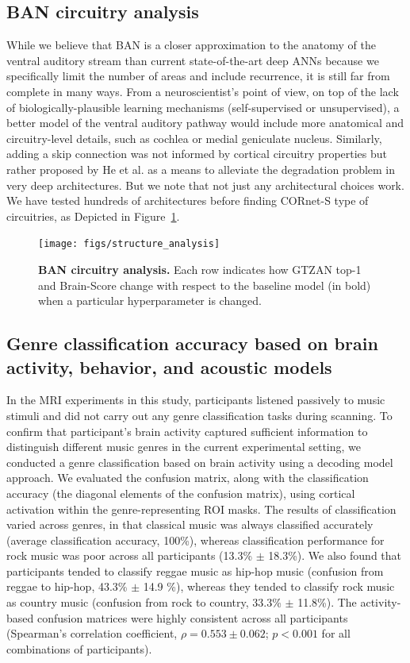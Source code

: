 \documentclass[journal]{IEEEtran}
\begin{document}
\subsection{BAN circuitry analysis}
While we believe that BAN is a closer approximation to the anatomy of the ventral auditory stream than current state-of-the-art deep ANNs because we specifically limit the number of areas and include recurrence, it is still far from complete in many ways. 
From a neuroscientist's point of view, on top of the lack of biologically-plausible learning mechanisms (self-supervised or unsupervised), a better model of the ventral auditory pathway would include more anatomical and circuitry-level details, such as cochlea or medial geniculate nucleus. 
Similarly, adding a skip connection was not informed by cortical circuitry properties but rather proposed by He et al.\cite{he2016deep} as a means to alleviate the degradation problem in very deep architectures. 
But we note that not just any architectural choices work.
We have tested hundreds of architectures before finding CORnet-S type of circuitries, as Depicted in Figure~\ref{fig:structure_analysis}.


\begin{figure}[t]
	\centering
	\texttt{[image: figs/structure\_analysis]}
	\caption{
		\textbf{
			BAN circuitry analysis.  
		}
		Each row indicates how GTZAN top-1 and Brain-Score change with respect to the baseline model (in bold) when a particular hyperparameter is changed.
	}
	\label{fig:structure_analysis}
\end{figure}


\subsection{Genre classification accuracy based on brain activity, behavior, and acoustic models}
In the MRI experiments in this study, participants listened passively to music stimuli and did not carry out any genre classification tasks during scanning.
To confirm that participant's brain activity captured sufficient information to distinguish different music genres in the current experimental setting, we conducted a genre classification based on brain activity using a decoding model approach.
We evaluated the confusion matrix, along with the classification accuracy (the diagonal elements of the confusion matrix), using cortical activation within the genre-representing ROI masks.
The results of classification varied across genres, in that classical music was always classified accurately (average classification accuracy, 100\%), whereas classification performance for rock music was poor across all participants (13.3\% $\pm$ 18.3\%).
We also found that participants tended to classify reggae music as hip-hop music (confusion from reggae to hip-hop, 43.3\% $\pm$ 14.9 \%), whereas they tended to classify rock music as country music (confusion from rock to country, 33.3\% $\pm$ 11.8\%).
The activity-based confusion matrices were highly consistent across all participants (Spearman's correlation coefficient, $ \rho = 0.553 \pm 0.062$; $ p < 0.001 $ for all combinations of participants).
\end{document}

